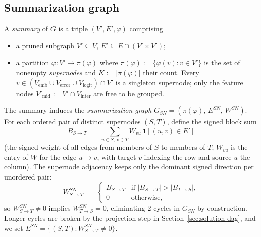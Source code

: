     \subsection{Summarization graph}
    A \emph{summary} of $G$ is a triple $(V', E', \varphi)$ comprising
    \begin{itemize}[leftmargin=*,topsep=2pt,itemsep=1pt]
    \item a pruned subgraph $V' \subseteq V$, $E' \subseteq E \cap (V' \times V')$;
    \item a partition $\varphi : V' \to \pi(\varphi)$ where
    $\pi(\varphi) := \{\varphi(v) : v \in V'\}$ is the set of nonempty
    \emph{supernodes} and $K := |\pi(\varphi)|$ their count. Every
    $v \in (V_{\text{emb}} \cup V_{\text{error}} \cup V_{\text{logit}}) \cap V'$ is a singleton
    supernode; only the feature nodes
    $V'_{\text{mid}} := V' \cap V_{\text{inter}}$ are free to be grouped.
    \end{itemize}
    The summary induces the \emph{summarization graph}
    $G_{SN} = (\pi(\varphi),\, E^{SN},\, W^{SN})$. For each ordered pair of
    distinct supernodes $(S, T)$, define the signed block sum
    \begin{equation}
    B_{S \to T}
    \;=\;
    \sum_{u \in S,\, v \in T} W_{vu}\,\mathbf{1}[(u, v) \in E']
    \label{eq:block-sum}
    \end{equation}
    (the signed weight of all edges from members of $S$ to members of $T$;
    $W_{vu}$ is the entry of $W$ for the edge $u \to v$, with target $v$
    indexing the row and source $u$ the column). The supernode
    adjacency keeps only the dominant signed direction per unordered pair:
    \begin{equation}
    W^{SN}_{S \to T}
    \;=\;
    \begin{cases}
    B_{S \to T} & \text{if } |B_{S \to T}| > |B_{T \to S}|, \\
    0           & \text{otherwise,}
    \end{cases}
    \label{eq:wsn}
    \end{equation}
    so $W^{SN}_{S \to T} \ne 0$ implies $W^{SN}_{T \to S} = 0$, eliminating
    $2$-cycles in $G_{SN}$ by construction. Longer cycles are broken by
    the projection step in Section~\ref{sec:solution-dag}, and we set
    $E^{SN} = \{(S, T) : W^{SN}_{S \to T} \ne 0\}$.


